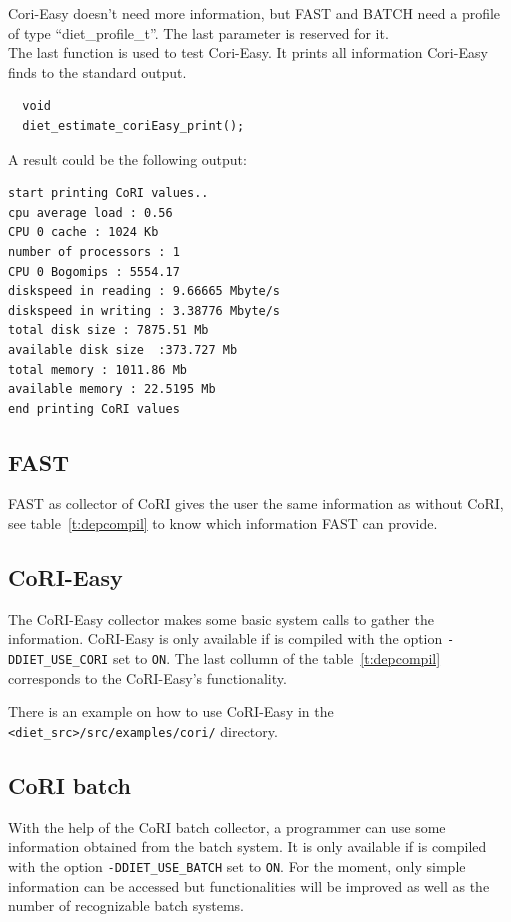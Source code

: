 Cori-Easy doesn't need more information, but FAST and BATCH need a profile of
type ``diet\_profile\_t''. The last parameter is reserved for it. \\ The last
function is used to test Cori-Easy. It prints all information Cori-Easy finds
to the standard output.

\footnotesize
\begin{verbatim}
  void
  diet_estimate_coriEasy_print();
\end{verbatim}
\normalsize
A result could be the following output:
\footnotesize
\begin{verbatim}
start printing CoRI values..
cpu average load : 0.56
CPU 0 cache : 1024 Kb
number of processors : 1
CPU 0 Bogomips : 5554.17
diskspeed in reading : 9.66665 Mbyte/s
diskspeed in writing : 3.38776 Mbyte/s
total disk size : 7875.51 Mb
available disk size  :373.727 Mb
total memory : 1011.86 Mb
available memory : 22.5195 Mb
end printing CoRI values
\end{verbatim}
\normalsize

\subsection{FAST}
FAST as collector of CoRI gives the user the same information as without CoRI,
see table~\ref{t:depcompil} to know which information FAST can provide.

\subsection{CoRI-Easy}
The CoRI-Easy collector makes some basic system calls to gather the
information. CoRI-Easy is only available if \diet is compiled with the option
\texttt{-DDIET\_USE\_CORI} set to \texttt{ON}. The last collumn of the
table~\ref{t:depcompil} corresponds to the CoRI-Easy's functionality.

There is an example on how to use CoRI-Easy in the
\verb!<diet_src>/src/examples/cori/! directory.

\subsection{CoRI batch}\label{section:cori_batch}
With the help of the CoRI batch collector, a \sed programmer can use some
information obtained from the batch system. It is only available if \diet is
compiled with the option \texttt{-DDIET\_USE\_BATCH} set to \texttt{ON}. For
the moment, only simple information can be accessed but functionalities will be
improved as well as the number of recognizable batch systems.

